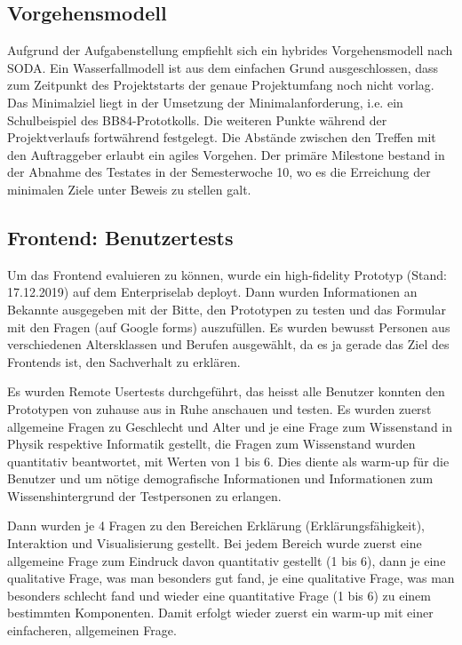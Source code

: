 \documentclass[a4paper,10.2pt,pdftex]{scrartcl}%
\begin{document}
\subsection{Vorgehensmodell}
Aufgrund der Aufgabenstellung empfiehlt sich ein hybrides Vorgehensmodell nach SODA. Ein Wasserfallmodell ist aus dem einfachen Grund ausgeschlossen, dass zum Zeitpunkt des Projektstarts der genaue Projektumfang noch nicht vorlag. Das Minimalziel liegt in der Umsetzung der Minimalanforderung, i.e. ein Schulbeispiel des BB84-Prototkolls. Die weiteren Punkte während der Projektverlaufs fortwährend festgelegt. Die Abstände zwischen den Treffen mit den Auftraggeber erlaubt ein agiles Vorgehen. Der primäre Milestone bestand in der Abnahme des Testates in der Semesterwoche 10, wo es die Erreichung der minimalen Ziele unter Beweis zu stellen galt.

\subsection{Frontend: Benutzertests}
Um das Frontend evaluieren zu können, wurde ein high-fidelity Prototyp (Stand: 17.12.2019) auf dem Enterpriselab deployt. Dann wurden Informationen an Bekannte ausgegeben mit der Bitte, den Prototypen zu testen und das Formular mit den Fragen (auf Google forms) auszufüllen. Es wurden bewusst Personen aus verschiedenen Altersklassen und Berufen ausgewählt, da es ja gerade das Ziel des Frontends ist, den Sachverhalt zu erklären.

Es wurden Remote Usertests durchgeführt, das heisst alle Benutzer konnten den Prototypen von zuhause aus in Ruhe anschauen und testen. Es wurden zuerst allgemeine Fragen zu Geschlecht und Alter und je eine Frage zum Wissenstand in Physik respektive Informatik gestellt, die Fragen zum Wissenstand wurden quantitativ beantwortet, mit Werten von 1 bis 6. Dies diente als warm-up für die Benutzer und um nötige demografische Informationen und Informationen zum Wissenshintergrund der Testpersonen zu erlangen.

Dann wurden je 4 Fragen zu den Bereichen Erklärung (Erklärungsfähigkeit), Interaktion und Visualisierung gestellt. Bei jedem Bereich wurde zuerst eine allgemeine Frage zum Eindruck davon quantitativ gestellt (1 bis 6), dann je eine qualitative Frage, was man besonders gut fand, je eine qualitative Frage, was man besonders schlecht fand und wieder eine quantitative Frage (1 bis 6) zu einem bestimmten Komponenten. Damit erfolgt wieder zuerst ein warm-up mit einer einfacheren, allgemeinen Frage.
\end{document}
